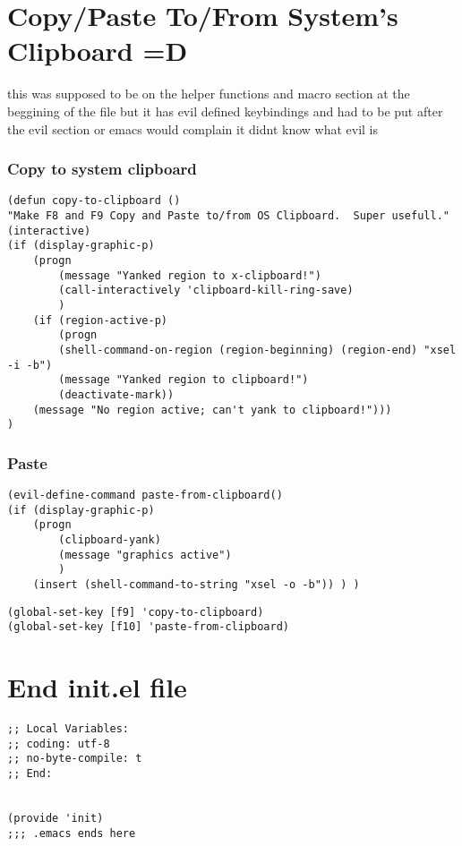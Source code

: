 \documentclass[11pt]{article}
\begin{document}
\section*{Copy/Paste To/From System's Clipboard =D}
\label{sec:orgda0ba5b}
this was supposed to be on the helper functions and macro section at the beggining of the file
but it has evil defined keybindings and had to be put after the evil section or emacs would complain it didnt know what evil is

\subsubsection*{Copy to system clipboard}
\label{sec:orgd70597a}

\begin{verbatim}
(defun copy-to-clipboard ()
"Make F8 and F9 Copy and Paste to/from OS Clipboard.  Super usefull."
(interactive)
(if (display-graphic-p)
    (progn
        (message "Yanked region to x-clipboard!")
        (call-interactively 'clipboard-kill-ring-save)
        )
    (if (region-active-p)
        (progn
        (shell-command-on-region (region-beginning) (region-end) "xsel -i -b")
        (message "Yanked region to clipboard!")
        (deactivate-mark))
    (message "No region active; can't yank to clipboard!")))
)
\end{verbatim}

\subsubsection*{Paste}
\label{sec:org9e71dd3}

\begin{verbatim}
(evil-define-command paste-from-clipboard()
(if (display-graphic-p)
    (progn
        (clipboard-yank)
        (message "graphics active")
        )
    (insert (shell-command-to-string "xsel -o -b")) ) )
\end{verbatim}

\begin{verbatim}
(global-set-key [f9] 'copy-to-clipboard)
(global-set-key [f10] 'paste-from-clipboard)
\end{verbatim}


\section*{End init.el file}
\label{sec:org10cc525}
\begin{verbatim}
;; Local Variables:
;; coding: utf-8
;; no-byte-compile: t
;; End:


(provide 'init)
;;; .emacs ends here

\end{verbatim}
\end{document}
